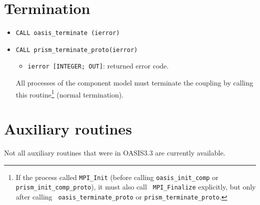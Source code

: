 \section{Termination}
\label{subsubsec_Termination}

\begin{itemize}

\item {\tt CALL oasis\_terminate (ierror)}
\item {\tt CALL prism\_terminate\_proto(ierror)}
  \begin{itemize}
  \item {\tt ierror [INTEGER; OUT]}: returned error code.
  \end{itemize}
  All processes of the component model must terminate the coupling by
  calling this routine\footnote{If the process called {\tt MPI\_Init}
    (before calling {\tt oasis\_init\_comp} or {\tt
      prism\_init\_comp\_proto}), it must also call {\tt
      MPI\_Finalize} explicitly, but only after calling {\tt
      oasis\_terminate\_proto} or {\tt prism\_terminate\_proto}.}
  (normal termination).

\end{itemize}


\section{Auxiliary routines}
\label{subsubsec_auxroutines}

Not all auxiliary routines that were in OASIS3.3 are currently
available.

